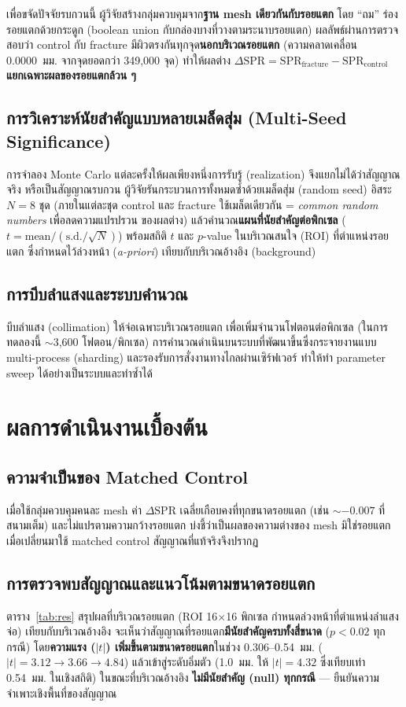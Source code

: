 \documentclass[14pt]{extarticle}
\begin{document}
เพื่อขจัดปัจจัยรบกวนนี้ ผู้วิจัยสร้างกลุ่มควบคุมจาก\textbf{ฐาน mesh เดียวกันกับรอยแตก}
โดย ``ถม'' ร่องรอยแตกด้วยกระดูก (boolean union กับกล่องบางที่วางตามระนาบรอยแตก)
ผลลัพธ์ผ่านการตรวจสอบว่า control กับ fracture มีผิวตรงกันทุกจุด\textbf{นอกบริเวณรอยแตก}
(ความคลาดเคลื่อน 0.0000~มม. จากจุดยอดกว่า 349{,}000 จุด) ทำให้ผลต่าง
$\Delta\mathrm{SPR}=\mathrm{SPR}_{\text{fracture}}-\mathrm{SPR}_{\text{control}}$
\textbf{แยกเฉพาะผลของรอยแตกล้วน ๆ}

\subsection{การวิเคราะห์นัยสำคัญแบบหลายเมล็ดสุ่ม (Multi-Seed Significance)}
การจำลอง Monte Carlo แต่ละครั้งให้ผลเพียงหนึ่งการรับรู้ (realization) จึงแยกไม่ได้ว่าสัญญาณจริง
หรือเป็นสัญญาณรบกวน ผู้วิจัยรันกระบวนการทั้งหมดซ้ำด้วยเมล็ดสุ่ม (random seed) อิสระ $N=8$ ชุด
(ภายในแต่ละชุด control และ fracture ใช้เมล็ดเดียวกัน = \textit{common random numbers} เพื่อลดความแปรปรวน
ของผลต่าง) แล้วคำนวณ\textbf{แผนที่นัยสำคัญต่อพิกเซล} ($t=\text{mean}/(\text{s.d.}/\sqrt{N})$)
พร้อมสถิติ $t$ และ $p$-value ในบริเวณสนใจ (ROI) ที่ตำแหน่งรอยแตก ซึ่งกำหนดไว้ล่วงหน้า
(\textit{a-priori}) เทียบกับบริเวณอ้างอิง (background)

\subsection{การบีบลำแสงและระบบคำนวณ}
บีบลำแสง (collimation) ให้จ่อเฉพาะบริเวณรอยแตก เพื่อเพิ่มจำนวนโฟตอนต่อพิกเซล
(ในการทดลองนี้ $\sim$3{,}600 โฟตอน/พิกเซล) การคำนวณดำเนินบนระบบที่พัฒนาขึ้นซึ่งกระจายงานแบบ
multi-process (sharding) และรองรับการสั่งงานทางไกลผ่านเซิร์ฟเวอร์ ทำให้ทำ parameter sweep
ได้อย่างเป็นระบบและทำซ้ำได้

\section{ผลการดำเนินงานเบื้องต้น}

\subsection{ความจำเป็นของ Matched Control}
เมื่อใช้กลุ่มควบคุมคนละ mesh ค่า $\Delta\mathrm{SPR}$ เฉลี่ยเกือบคงที่ทุกขนาดรอยแตก
(เช่น $\sim -0.007$ ที่สนามเต็ม) และไม่แปรตามความกว้างรอยแตก บ่งชี้ว่าเป็นผลของความต่างของ mesh
มิใช่รอยแตก เมื่อเปลี่ยนมาใช้ matched control สัญญาณที่แท้จริงจึงปรากฏ

\subsection{การตรวจพบสัญญาณและแนวโน้มตามขนาดรอยแตก}
ตาราง~\ref{tab:res} สรุปผลที่บริเวณรอยแตก (ROI 16$\times$16 พิกเซล กำหนดล่วงหน้าที่ตำแหน่งลำแสงจ่อ)
เทียบกับบริเวณอ้างอิง จะเห็นว่าสัญญาณที่รอยแตก\textbf{มีนัยสำคัญครบทั้งสี่ขนาด} ($p<0.02$ ทุกกรณี)
โดย\textbf{ความแรง ($|t|$) เพิ่มขึ้นตามขนาดรอยแตก}ในช่วง 0.306--0.54~มม. ($|t|=3.12\to3.66\to4.84$)
แล้วเข้าสู่ระดับอิ่มตัว (1.0~มม. ให้ $|t|=4.32$ ซึ่งเทียบเท่า 0.54~มม. ในเชิงสถิติ) ในขณะที่บริเวณอ้างอิง
\textbf{ไม่มีนัยสำคัญ (null) ทุกกรณี} --- ยืนยันความจำเพาะเชิงพื้นที่ของสัญญาณ
\end{document}

